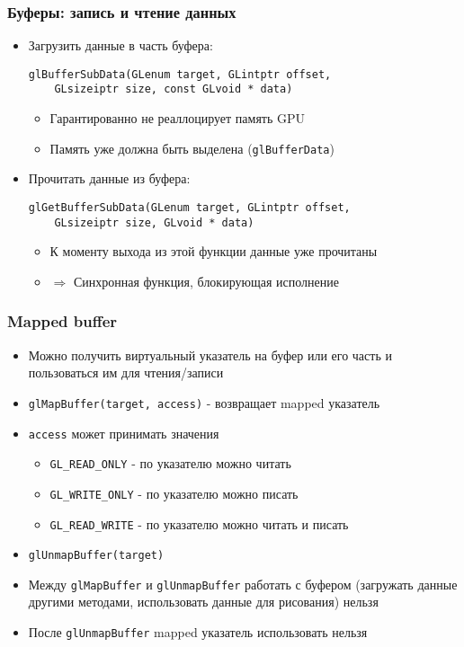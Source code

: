 \documentclass{beamer}
\begin{document}
\begin{frame}[fragile]
\frametitle{Буферы: запись и чтение данных}
\begin{itemize}
\item Загрузить данные в часть буфера:
\begin{verbatim}
glBufferSubData(GLenum target, GLintptr offset,
    GLsizeiptr size, const GLvoid * data)
\end{verbatim}
\pause
\begin{itemize}
\item Гарантированно не реаллоцирует память GPU
\item Память уже должна быть выделена (\verb|glBufferData|)
\end{itemize}
\pause
\item Прочитать данные из буфера:
\begin{verbatim}
glGetBufferSubData(GLenum target, GLintptr offset,
    GLsizeiptr size, GLvoid * data)
\end{verbatim}
\pause
\begin{itemize}
\item К моменту выхода из этой функции данные уже прочитаны
\item \begin{math}\Rightarrow\end{math} Синхронная функция, блокирующая исполнение
\end{itemize}
\end{itemize}
\end{frame}

\begin{frame}[fragile]
\frametitle{Mapped buffer}
\begin{itemize}
\item Можно получить виртуальный указатель на буфер или его часть и пользоваться им для чтения/записи
\pause
\item \verb|glMapBuffer(target, access)| - возвращает mapped указатель
\item \verb|access| может принимать значения
\begin{itemize}
\item \verb|GL_READ_ONLY| - по указателю можно читать
\item \verb|GL_WRITE_ONLY| - по указателю можно писать
\item \verb|GL_READ_WRITE| - по указателю можно читать и писать
\end{itemize}
\pause
\item \verb|glUnmapBuffer(target)|
\pause
\item Между \verb|glMapBuffer| и \verb|glUnmapBuffer| работать с буфером (загружать данные другими методами, использовать данные для рисования) нельзя
\pause
\item После \verb|glUnmapBuffer| mapped указатель использовать нельзя
\end{itemize}
\end{frame}
\end{document}
